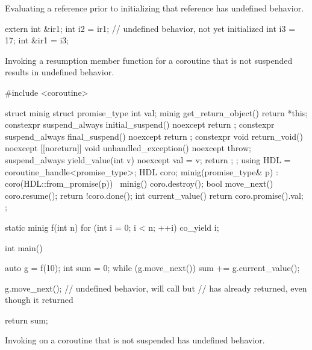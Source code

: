 \pnum
Evaluating a reference
prior to initializing that
reference has undefined behavior.

\pnum
\begin{example}
\begin{codeblock}
extern int &ir1;
int i2 = ir1;   // undefined behavior,  not yet initialized
int i3 = 17;
int &ir1 = i3;
\end{codeblock}
\end{example}


\pnum
Invoking a resumption member function for a coroutine
that is not suspended
results in undefined behavior.

\pnum
\begin{example}
\begin{codeblock}
#include <coroutine>

struct minig {
  struct promise_type {
    int val;
    minig get_return_object() { return {*this}; }
    constexpr suspend_always initial_suspend() noexcept { return {}; }
    constexpr suspend_always final_suspend() noexcept { return {}; }
    constexpr void return_void() noexcept {}
    [[noreturn]] void unhandled_exception() noexcept { throw; }
    suspend_always yield_value(int v) noexcept {
      val = v;
      return {};
    }
  };
  using HDL = coroutine_handle<promise_type>;
  HDL coro;
  minig(promise_type& p) : coro(HDL::from_promise(p)) {}
  ~minig() { coro.destroy(); }
  bool move_next() {
    coro.resume();
    return !coro.done();
  }
  int current_value() { return coro.promise().val; }
};

static minig f(int n) {
  for (int i = 0; i < n; ++i)
    co_yield i;
}

int main() {
  auto g = f(10);
  int sum = 0;
  while (g.move_next())
    sum += g.current_value();

  g.move_next();    // undefined behavior, will call  but 
                    // has already returned, even though it returned 

  return sum;
}
\end{codeblock}
\end{example}


\pnum
Invoking  on a coroutine that is not suspended has undefined behavior.

